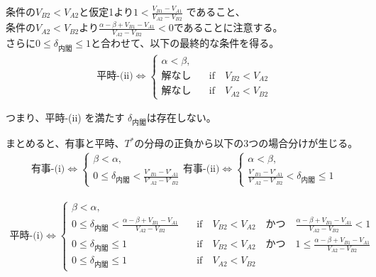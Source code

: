 \documentclass[main.tex]{subfiles}
\begin{document}
\noindent
条件の$V_{B2} < V_{A2}$と仮定1より$1 < \frac{V_{B1} - V_{A1}}{V_{A2} - V_{B2}}$ であること、\\
条件の$V_{A2} < V_{B2}$より$\frac{\alpha-\beta + V_{B1}-V_{A1}}{V_{A2} - V_{B2}} < 0$であることに注意する。\\
さらに$0 \le \delta_{内閣} \le 1$と合わせて、以下の最終的な条件を得る。
\begin{align*}
    \text{平時-(ii)} \Leftrightarrow 
    \begin{cases}
        \alpha < \beta, \\
        解なし \quad&\text{if}\quad V_{B2} < V_{A2}\\
        解なし \quad&\text{if}\quad V_{A2} < V_{B2}
    \end{cases}
\end{align*}

\noindent
つまり、平時-(ii) を満たす $\delta_{内閣}$は存在しない。

\bigskip
まとめると、有事と平時、$T^*$の分母の正負から以下の3つの場合分けが生じる。
\begin{align*}
    \text{有事-(i)} \Leftrightarrow 
    \begin{cases}
        \beta < \alpha, \\
        0 \le \delta_{内閣} < \frac{V'_{B1}-V'_{A1}}{V'_{A2} - V'_{B2}}
    \end{cases}
    \text{有事-(ii)} \Leftrightarrow 
    \begin{cases}
        \alpha < \beta, \\
        \frac{V'_{B1}-V'_{A1}}{V'_{A2} - V'_{B2}} < \delta_{内閣} \le 1
    \end{cases}
\end{align*}

\begin{align*}
    \text{平時-(i)} \Leftrightarrow 
    \begin{cases}
        \beta < \alpha, \\
        0 \le \delta_{内閣} < \frac{\alpha-\beta + V_{B1}-V_{A1}}{V_{A2} - V_{B2}} \quad&\text{if}\quad V_{B2} < V_{A2} \quad{かつ}\quad \frac{\alpha-\beta + V_{B1}-V_{A1}}{V_{A2} - V_{B2}}<1\\
        0 \le \delta_{内閣} \le 1 \quad&\text{if}\quad V_{B2} < V_{A2} \quad{かつ}\quad 1 \le \frac{\alpha-\beta + V_{B1}-V_{A1}}{V_{A2} - V_{B2}}\\
        0 \le \delta_{内閣} \le 1 \quad&\text{if}\quad V_{A2} < V_{B2}
    \end{cases}
\end{align*}
\end{document}
